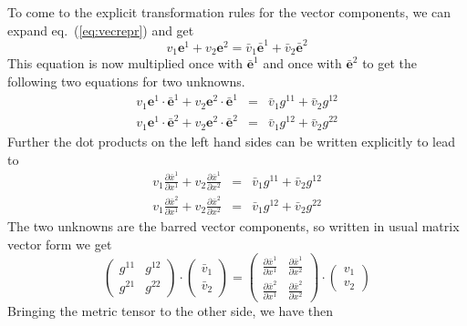 To come to the explicit transformation rules for the vector
components, we can expand eq.~(\ref{eq:vecrepr}) and get
\begin{displaymath}
  v_1\mathbf{e}^1+v_2\mathbf{e}^2=\bar v_1\bar{\mathbf{e}}^1+\bar v_2\bar{\mathbf{e}}^2
\end{displaymath}
This equation is now multiplied once with $\bar{\mathbf{e}}^1$ and
once with $\bar{\mathbf{e}}^2$ to get the following two equations for
two unknowns.
\begin{eqnarray*}
  v_1\mathbf{e}^1\cdot\bar{\mathbf{e}}^1
  +v_2\mathbf{e}^2\cdot\bar{\mathbf{e}}^1
  &=& \bar v_1g^{11}+\bar v_2g^{12}\\
  v_1\mathbf{e}^1\cdot\bar{\mathbf{e}}^2
  +v_2\mathbf{e}^2\cdot\bar{\mathbf{e}}^2
  &=& \bar v_1g^{12}+\bar v_2g^{22}
\end{eqnarray*}
Further the dot products on the left hand sides can be written explicitly to lead
to
\begin{eqnarray*}
  v_1 \frac{\partial\bar x^1}{\partial x^1}
  +v_2\frac{\partial\bar x^1}{\partial x^2}
  &=& \bar v_1g^{11}+\bar v_2g^{12}\\
  v_1 \frac{\partial\bar x^2}{\partial x^1}
  +v_2\frac{\partial\bar x^2}{\partial x^2}
  &=& \bar v_1g^{12}+\bar v_2g^{22}
\end{eqnarray*}
The two unknowns are the barred vector components, so written in usual
matrix vector form we get
\begin{displaymath}
  \left(
    \begin{array}{cc}
      g^{11} & g^{12}\\
      g^{21} & g^{22}
    \end{array}
  \right)\cdot \left(
    \begin{array}{c}
      \bar v_1\\ \bar{v}_2
    \end{array}
  \right)
  = \left(
    \begin{array}{cc}
      \frac{\partial\bar x^1}{\partial x^1} &
      \frac{\partial\bar x^1}{\partial x^2}\\
      \frac{\partial\bar x^2}{\partial x^1} &
      \frac{\partial\bar x^2}{\partial x^2}
    \end{array}\right)\cdot\left(
    \begin{array}{c}
      v_1 \\
      v_2
    \end{array}
  \right)
\end{displaymath}
Bringing the metric tensor to the other side, we have then
